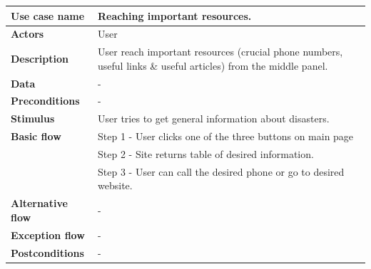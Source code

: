 \begin{center}
    \begin{table}[H]
        \begin{tabular}{| m{3cm}| m{10cm} |}
            \hline
            \textbf{Use case name}    & Reaching important resources.                                                                                  \\
            \hline
            \textbf{Actors}           & User                                                                                                           \\
            \hline
            \textbf{Description}      & User reach important resources (crucial phone numbers, useful links \& useful articles) from the middle panel. \\
            \hline
            \textbf{Data}             & -                                                                                                              \\
            \hline
            \textbf{Preconditions}    & -                                                                                                              \\
            \hline
            \textbf{Stimulus}         & User tries to get general information about disasters.                                                         \\
            \hline
            \textbf{Basic flow}       & Step 1 - User clicks one of the three buttons on main page                                                     \\
                                      & Step 2 - Site returns table of desired information.                                                            \\
                                      & Step 3 - User can call the desired phone or go to desired website.                                             \\
            \hline
            \textbf{Alternative flow} & -                                                                                                              \\
            \hline
            \textbf{Exception flow}   & -                                                                                                              \\
            \hline
            \textbf{Postconditions}   & -                                                                                                              \\

\end{tabular}
\end{table}
\end{center}

